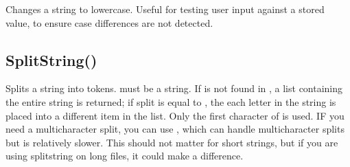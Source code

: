 \documentclass[letterpaper,10pt,english]{sphinxmanual}
\begin{document}
\sphinxAtStartPar
Changes a string to lowercase.  Useful for testing user                 input against a stored value, to ensure case differences                are not detected.

\sphinxAtStartPar
{}

\begin{sphinxVerbatim}[commandchars=\\\{\}]
\end{sphinxVerbatim}

\sphinxAtStartPar
{}

\begin{sphinxVerbatim}[commandchars=\\\{\}]
\end{sphinxVerbatim}

\sphinxAtStartPar
{}

\sphinxAtStartPar
{}

\ignorespaces 

\subsection{SplitString()}
\label{\detokenize{reference/peblstring:splitstring}}\label{\detokenize{reference/peblstring:index-4}}
\sphinxAtStartPar
{}

\sphinxAtStartPar
Splits a string into tokens.  must be a string. If            is not found in , a list containing the entire                  string is returned; if split is equal to , the each letter                in the string is placed into a different item in the list.  Only the first character of  is used.  IF you need a multicharacter split, you can use , which can handle multi\sphinxhyphen{}character splits but is relatively slower. This should not matter for short strings, but if you are using splitstring on long files, it could make a difference.
\end{document}
